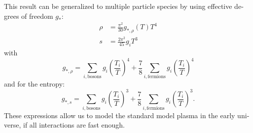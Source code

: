 \documentclass[master,       %
               twoside,        %
               BCOR10mm,       %
               english,ngerman, %
               ]{GAUBM}
\begin{document}
\begin{otherlanguage}{english}
This result can be generalized to multiple particle species by using effective degrees of freedom $g_*$:
\begin{align}
	\rho &= \frac{\pi^2}{30} g_{*, \rho}(T) T^4 \nonumber \\
	s &= \frac{2 \pi^2}{45} g_i T^3
\end{align}
with
\begin{equation}
	g_{*, \rho} = \sum_{i, \text{bosons}} g_i \left( \frac{T_i}{T} \right)^4 + \frac{7}{8} \sum_{i, \text{fermions}} g_i \left( \frac{T_i}{T} \right)^4
\end{equation}
and for the entropy:
\begin{equation}
	g_{*, s} = \sum_{i, \text{bosons}} g_i \left( \frac{T_i}{T} \right)^3 + \frac{7}{8} \sum_{i, \text{fermions}} g_i \left( \frac{T_i}{T} \right)^3.
\end{equation}
These expressions allow us to model the standard model plasma in the early universe, if
all interactions are fast enough.



\end{otherlanguage}
\end{document}
